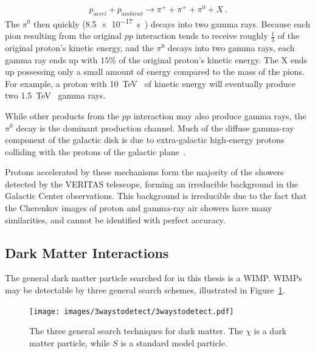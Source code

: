     $$ p_{accel} + p_{ambient} \rightarrow \pi^+ + \pi^+ + \pi^0 + X \,.$$
  The $\pi^{0}$ then quickly (\SI{8.5e-17}{s}~\cite{pdg2016}) decays into two gamma rays.
  Because each pion resulting from the original $pp$ interaction tends to receive roughly $\frac{1}{3}$ of the original proton's kinetic energy, and the $\pi^0$ decays into two gamma rays, each gamma ray ends up with \nicetilde$15\%$ of the original proton's kinetic energy.
  The X ends up possessing only a small amount of energy compared to the mass of the pions.
  For example, a proton with \SI{10}{\TeV{}} of kinetic energy will eventually produce two \SI{1.5}{\TeV{}} gamma rays.
  
  While other products from the $pp$ interaction may also produce gamma rays, the $\pi^0$ decay is the dominant production channel.
  Much of the diffuse gamma-ray component of the galactic disk is due to extra-galactic high-energy protons colliding with the protons of the galactic plane~\cite{GalacticDiffuseGammaRays,extragalactic_agn}.
  
  Protons accelerated by these mechanisms form the majority of the showers detected by the VERITAS telescope, forming an irreducible background in the Galactic Center observations.
  This background is irreducible due to the fact that the Cherenkov images of proton and gamma-ray air showers have many similarities, and cannot be identified with perfect accuracy.
  
  \subsection{Dark Matter Interactions}\label{dmgammaproduction}
    
    The general dark matter particle searched for in this thesis is a WIMP.
    WIMPs may be detectable by three general search schemes, illustrated in Figure~\ref{fig:3_searches}.

    \begin{figure}[!h]
      \centering
      \texttt{[image: images/3waystodetect/3waystodetect.pdf]}
      \caption[Three Search Techniques]{
        The three general search techniques for dark matter.
        The $\chi$ is a dark matter particle, while $S$ is a standard model particle.
      }
      \label{fig:3_searches}
    \end{figure}
    
